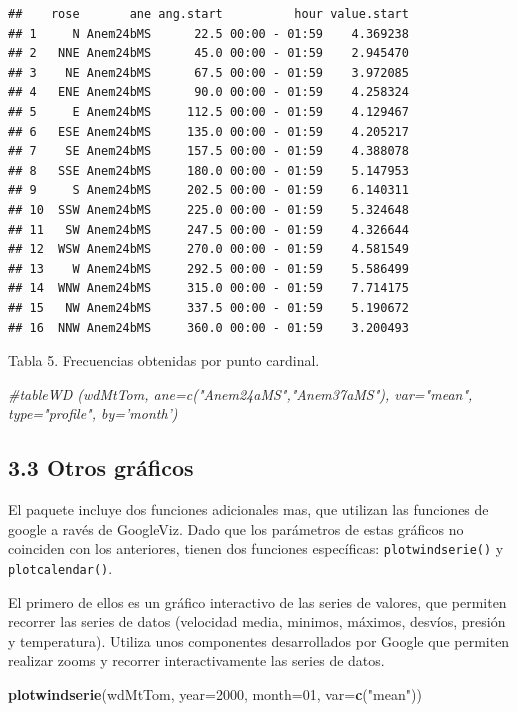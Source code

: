 \documentclass[]{article}
\newenvironment{Shaded}{\begin{snugshade}}{\end{snugshade}}
\newcommand{\KeywordTok}[1]{\textcolor[rgb]{0.13,0.29,0.53}{\textbf{{#1}}}}
\newcommand{\DataTypeTok}[1]{\textcolor[rgb]{0.13,0.29,0.53}{{#1}}}
\newcommand{\DecValTok}[1]{\textcolor[rgb]{0.00,0.00,0.81}{{#1}}}
\newcommand{\StringTok}[1]{\textcolor[rgb]{0.31,0.60,0.02}{{#1}}}
\newcommand{\CommentTok}[1]{\textcolor[rgb]{0.56,0.35,0.01}{\textit{{#1}}}}
\newcommand{\NormalTok}[1]{{#1}}
\begin{document}
\begin{verbatim}
##    rose       ane ang.start          hour value.start
## 1     N Anem24bMS      22.5 00:00 - 01:59    4.369238
## 2   NNE Anem24bMS      45.0 00:00 - 01:59    2.945470
## 3    NE Anem24bMS      67.5 00:00 - 01:59    3.972085
## 4   ENE Anem24bMS      90.0 00:00 - 01:59    4.258324
## 5     E Anem24bMS     112.5 00:00 - 01:59    4.129467
## 6   ESE Anem24bMS     135.0 00:00 - 01:59    4.205217
## 7    SE Anem24bMS     157.5 00:00 - 01:59    4.388078
## 8   SSE Anem24bMS     180.0 00:00 - 01:59    5.147953
## 9     S Anem24bMS     202.5 00:00 - 01:59    6.140311
## 10  SSW Anem24bMS     225.0 00:00 - 01:59    5.324648
## 11   SW Anem24bMS     247.5 00:00 - 01:59    4.326644
## 12  WSW Anem24bMS     270.0 00:00 - 01:59    4.581549
## 13    W Anem24bMS     292.5 00:00 - 01:59    5.586499
## 14  WNW Anem24bMS     315.0 00:00 - 01:59    7.714175
## 15   NW Anem24bMS     337.5 00:00 - 01:59    5.190672
## 16  NNW Anem24bMS     360.0 00:00 - 01:59    3.200493
\end{verbatim}

Tabla 5. Frecuencias obtenidas por punto cardinal.

\begin{Shaded}
\begin{Highlighting}[]
\CommentTok{#tableWD (wdMtTom, ane=c("Anem24aMS","Anem37aMS"), var="mean", type="profile", by='month')}
\end{Highlighting}
\end{Shaded}

\subsection{3.3 Otros gráficos}\label{otros-graficos}

El paquete incluye dos funciones adicionales mas, que utilizan las
funciones de google a ravés de GoogleViz. Dado que los parámetros de
estas gráficos no coinciden con los anteriores, tienen dos funciones
específicas: \texttt{plotwindserie()} y \texttt{plotcalendar()}.

El primero de ellos es un gráfico interactivo de las series de valores,
que permiten recorrer las series de datos (velocidad media, minimos,
máximos, desvíos, presión y temperatura). Utiliza unos componentes
desarrollados por Google que permiten realizar zooms y recorrer
interactivamente las series de datos.

\begin{Shaded}
\begin{Highlighting}[]
\KeywordTok{plotwindserie}\NormalTok{(wdMtTom, }\DataTypeTok{year=}\DecValTok{2000}\NormalTok{, }\DataTypeTok{month=}\DecValTok{01}\NormalTok{, }\DataTypeTok{var=}\KeywordTok{c}\NormalTok{(}\StringTok{"mean"}\NormalTok{))}
\end{Highlighting}
\end{Shaded}
\end{document}
